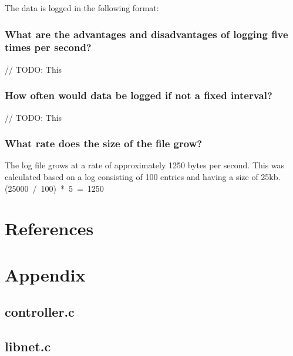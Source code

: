 \documentclass{article}
\begin{document}
{        The data is logged in the following format:
        

        \subsubsection{What are the advantages and disadvantages of logging five times per second?}
        // TODO: This

        \subsubsection{How often would data be logged if not a fixed interval?}
        // TODO: This

        \subsubsection{{What rate does the size of the file grow?}}
        The log file grows at a rate of approximately 1250 bytes per second.
        This was calculated based on a log consisting of 100 entries and having
        a size of 25kb. \mbox{(25000 / 100) * 5 = 1250}
}

\section*{References}

\printbibliography

\section*{Appendix}

\subsection*{controller.c}


\subsection*{libnet.c}

\end{document}
